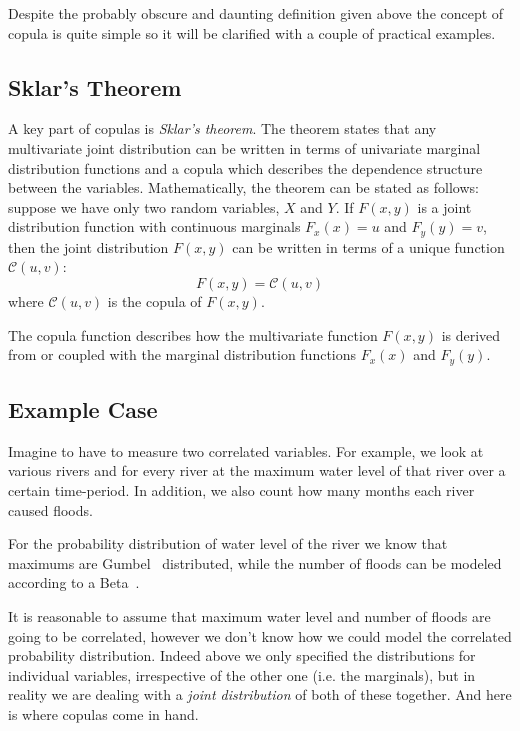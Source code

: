 Despite the probably obscure and daunting definition given above the concept of copula is quite simple so it will be clarified with a couple of practical examples.

\subsection{Sklar's Theorem}

A key part of copulas is \emph{Sklar’s theorem}. The theorem states that any multivariate joint distribution can be written in terms of univariate marginal distribution functions and a copula which describes the dependence structure between the variables. Mathematically, the theorem can be stated as follows: suppose we have only two random variables, $X$ and $Y$. If $F(x,y)$ is a joint distribution function with continuous marginals 
$F_x(x)=u$ and $F_y(y)=v$, then the joint distribution $F(x,y)$ can be written in terms of a unique function $\mathcal{C}(u,v)$:
\begin{equation}
F(x,y)=\mathcal{C}(u,v)
\end{equation}
\noindent
where $\mathcal{C}(u,v)$ is the copula of $F(x,y)$.

The copula function describes how the multivariate function $F(x,y)$ is derived from or coupled with the marginal distribution functions $F_x(x)$ and $F_y(y)$.


\subsection{Example Case}
\label{example-problem-case}

Imagine to have to measure two correlated variables. For example, we look at various rivers and for every river at the maximum water level of that river over a certain time-period. In addition, we also count how many months each river caused floods.

For the probability distribution of water level of the river we know that maximums are Gumbel~\cite{bib:gumbel} distributed, while the number of floods can be modeled according to a Beta~\cite{bib:beta}.

It is reasonable to assume that maximum water level and number of floods are going to be correlated, however we don't know how we could model the correlated probability distribution.
Indeed above we only specified the distributions for individual variables, irrespective of the other one (i.e. the marginals), but in reality we are dealing with a \emph{joint distribution} of both of these together. And here is where copulas come in hand.

